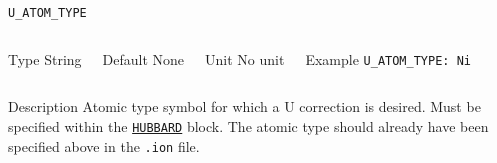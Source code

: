 \documentclass[xcolor=dvipsnames,t]{beamer}
\begin{document}
\begin{frame}[allowframebreaks]{\texttt{U\_ATOM\_TYPE}} \label{U_ATOM_TYPE}
\vspace*{-12pt}
\begin{columns}
\begin{block}{Type}
String
\end{block}

\begin{block}{Default}
None
\end{block}

\begin{block}{Unit}
No unit
\end{block}

\begin{block}{Example}
\texttt{U\_ATOM\_TYPE: Ni \\}
\end{block}
\end{columns}

\begin{block}{Description}
Atomic type symbol for which a U correction is desired. Must be specified within the \hyperlink{HUBBARD}{\texttt{HUBBARD}} block. The atomic type should already have been specified above in the \texttt{.ion} file.
\end{block}

\end{frame}
\end{document}
